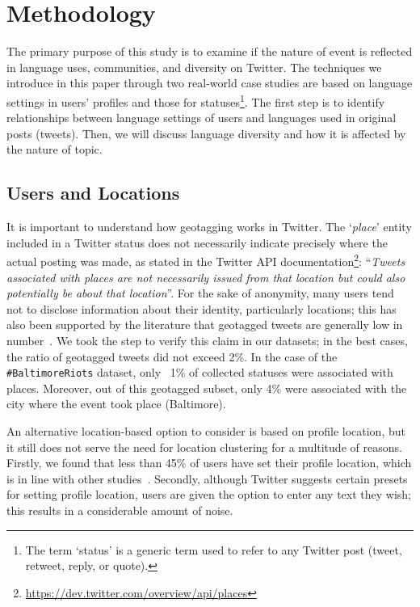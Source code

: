 \section{Methodology}\label{method}

The primary purpose of this study is to examine if the nature of event
is reflected in language uses, communities, and diversity on
Twitter. The techniques we introduce in this paper through two
real-world case studies are based on language settings in users'
profiles and those for statuses\footnote{The term `status' is a
generic term used to refer to any Twitter post (tweet, retweet, reply,
or quote).}.  The first step is to identify relationships between
language settings of users and languages used in original posts
(tweets). Then, we will discuss language diversity and how it is
affected by the nature of topic.

\subsection{Users and Locations}

It is important to understand how geotagging works in Twitter. The
`{\emph{place}}' entity included in a Twitter status does not
necessarily indicate precisely where the actual posting was made, as
stated in the Twitter API
documentation\footnote{\url{https://dev.twitter.com/overview/api/places}}:
``{\emph{Tweets associated with places are not necessarily issued from
that location but could also potentially be about that
location}}''. For the sake of anonymity, many users tend not to
disclose information about their identity, particularly locations;
this has also been supported by the literature that geotagged tweets
are generally low in number~\cite{kang-et-al:2013}. We took the step
to verify this claim in our datasets; in the best cases, the ratio of
geotagged tweets did not exceed 2\%. In the case of the
{\texttt{\#BaltimoreRiots}} dataset, only ~1\% of collected statuses
were associated with places. Moreover, out of this geotagged subset,
only 4\% were associated with the city where the event took place
(Baltimore).

An alternative location-based option to consider is based on profile
location, but it still does not serve the need for location clustering
for a multitude of reasons. Firstly, we found that less than 45\% of
users have set their profile location, which is in line with other
studies~\cite{graham-et-al:2014}. Secondly, although Twitter suggests
certain presets for setting profile location, users are given the
option to enter any text they wish; this results in a considerable
amount of noise.

